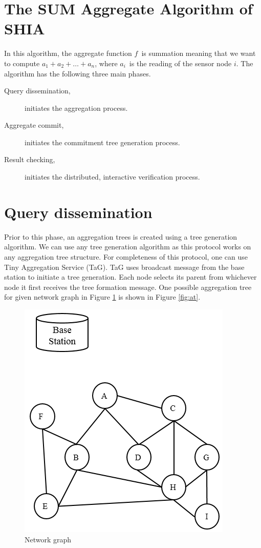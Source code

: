 \section{The SUM Aggregate Algorithm of SHIA}
		In this algorithm, the aggregate function $f$\ is summation meaning that we want to compute $a_{1} + a_{2} + \dotsc + a_{n}$, where $a_{i}$\ is the reading of the sensor node $i$.
		The algorithm has the following three main phases.
		\begin{description}
			\item [Query dissemination,] initiates the aggregation process.
			\item [Aggregate commit,] initiates the commitment tree generation process.
			\item [Result checking,] initiates the distributed, interactive verification process.
		\end{description}

\section{Query dissemination}
	\label{sec:query-dissemination}
	Prior to this phase, an aggregation trees is created using a tree generation algorithm.
	We can use any tree generation algorithm as this protocol works on any aggregation tree structure.
	For completeness of this protocol, one can use Tiny Aggregation Service (TaG)\cite{madden2002tag}.
	TaG uses broadcast message from the base station to initiate a tree generation.
	Each node selects its parent from whichever node it first receives the tree formation message.
	One possible aggregation tree for given network graph in Figure \ref{fig:ng} is shown in Figure \ref{fig:at}. 
	\begin{figure}[h!]
		\centering
		\includegraphics[scale = 1]{images/network-graph.png}
		\caption{Network graph}
		\label{fig:ng}
	\end{figure}

